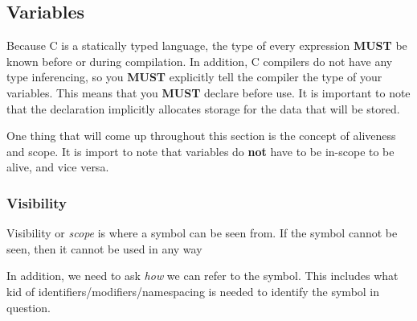 



\subsection{Variables}\label{subsec:Variables}
Because C is a statically typed language, the type of every expression \textbf{MUST} be known before or during compilation.
In addition, C compilers do not have any type inferencing, so you \textbf{MUST} explicitly tell the compiler the type of your variables.
This means that you \textbf{MUST} declare before use.
It is important to note that the declaration implicitly allocates storage for the data that will be stored.

One thing that will come up throughout this section is the concept of aliveness and scope.
It is import to note that variables do \textbf{not} have to be in-scope to be alive, and vice versa.

\subsubsection{Visibility}\label{subsubsec:Variable_Visibility}
Visibility or \emph{scope} is where a symbol can be seen from.
If the symbol cannot be seen, then it cannot be used in any way

In addition, we need to ask \textit{how} we can refer to the symbol.
This includes what kid of identifiers/modifiers/namespacing is needed to identify the symbol in question.


